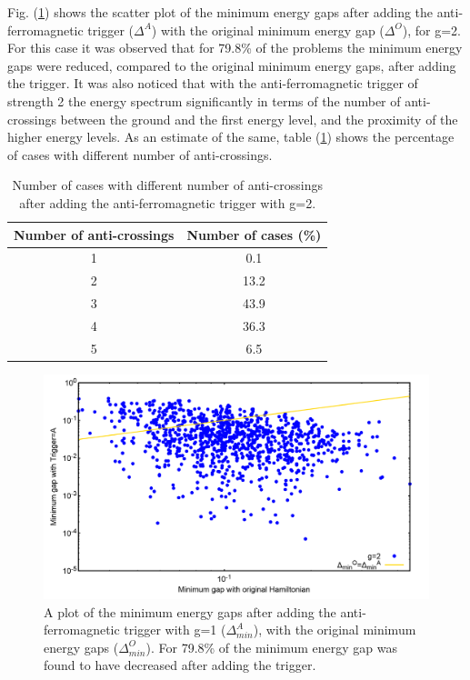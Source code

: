 \documentclass[../main.tex]{subfiles}
\begin{document}
Fig. (\ref{fig:a37}) shows the scatter plot of the minimum energy gaps after adding the anti-ferromagnetic trigger ($\Delta^A$) with the original minimum energy gap ($\Delta^O$), for g=2. For this case it was observed that for 79.8\% of the problems the minimum energy gaps were reduced, compared to the original minimum energy gaps, after adding the trigger. It was also noticed that with the anti-ferromagnetic trigger of strength 2 the energy spectrum significantly in terms of the number of anti-crossings between the ground and the first energy level, and the proximity of the higher energy levels. As an estimate of the same, table (\ref{tab:a5}) shows the percentage of cases with different number of anti-crossings.
\begin{table}[H]
\centering
\renewcommand{\arraystretch}{1.5}
\begin{tabular}{|c|c|}
\hline 
Number of anti-crossings & Number of cases (\%) \\ 
\hline 
1 & 0.1 \\ 
\hline 
2 & 13.2 \\ 
\hline 
3 & 43.9 \\ 
\hline 
4 & 36.3 \\ 
\hline 
5 & 6.5 \\
\hline
\end{tabular} 
\caption{Number of cases with different number of anti-crossings after adding the anti-ferromagnetic trigger with g=2.}
\label{tab:a5}

\end{table}
\begin{figure}[H]
\centering 
\includegraphics[scale=0.24]{MinGap_A_g2.png}
\caption{A plot of the minimum energy gaps after adding the anti-ferromagnetic trigger with g=1 ($\Delta_{min}^A$), with the original minimum energy gaps ($\Delta_{min}^O$). For 79.8\% of the minimum energy gap was found to have decreased after adding the trigger.}
\label{fig:a37}
\end{figure}
\end{document}
